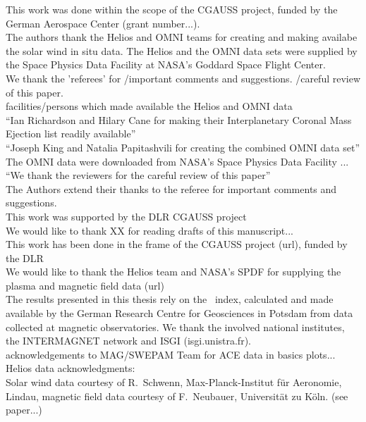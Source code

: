This work was done within the scope of the CGAUSS project, funded by the German Aerospace Center (grant number...).\\
The authors thank the Helios and OMNI teams for creating and making availabe the solar wind in situ data. The Helios and the OMNI data sets were supplied by the Space Physics Data Facility at NASA's Goddard Space Flight Center.\\
We thank the 'referees' for /important comments and suggestions. /careful review of this paper.\\

facilities/persons which made available the Helios and OMNI data\\
``Ian Richardson and Hilary Cane for making their Interplanetary Coronal Mass Ejection list readily available''\\
``Joseph King and Natalia Papitashvili for creating the combined OMNI data set''\\
The OMNI data were downloaded from NASA's Space Physics Data Facility ...\\
``We thank the reviewers for the careful review of this paper''\\
The Authors extend their thanks to the referee for important comments and suggestions.\\
This work was supported by the DLR CGAUSS project\\
We would like to thank XX for reading drafts of this manuscript...\\
This work has been done in the frame of the CGAUSS project (url), funded by the DLR\\
We would like to thank the Helios team and NASA's SPDF for supplying the plasma and magnetic field data (url)\\


The results presented in this thesis rely on the \Kp{}~index, calculated and made available by the German Research Centre for Geosciences in Potsdam from data collected at magnetic observatories. We thank the involved national institutes, the INTERMAGNET network and ISGI (isgi.unistra.fr).\\



acknowledgements to MAG/SWEPAM Team for ACE data in basics plots...\\

Helios data acknowledgments:\\
Solar wind data courtesy of R.~Schwenn, Max-Planck-Institut für Aeronomie, Lindau, magnetic field data courtesy of F.~Neubauer, Universität zu Köln. (see paper...)\\

